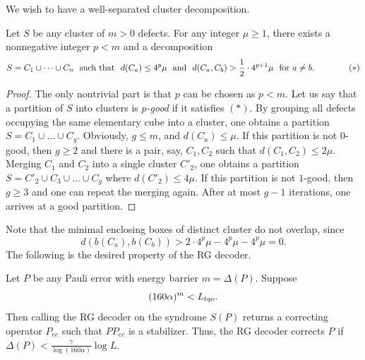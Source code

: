 We wish to have a well-separated cluster decomposition.
\begin{lem}
\label{lemma:wellseparated-decomposition}
Let $S$ be any cluster of $m>0$ defects.
For any integer $\mu \ge 1$, there exists a nonnegative integer $ p < m$ 
and a decomposition 
\[
S = C_1 \cup \cdots \cup C_n \ \text{ such that }\ 
d(C_a) \le 4^p \mu \ \text{ and }\  d(C_a,C_b) > \half \cdot 4^{p+1} \mu \ \text{ for } a \neq b.
\quad \quad \quad \quad \mathrm{(*)}
\]
\end{lem}
\begin{proof}
The only nontrivial part is that $p$ can be chosen as $p < m$.
Let us say that a partition of $S$ into clusters is \emph{$p$-good} if it satisfies $\mathrm{(*)}$.
By grouping all defects occupying the same elementary cube into a cluster,
one obtains a partition $S=C_1\cup \ldots \cup C_g$. Obviously, $g\le m$, and $d(C_a) \le \mu$.
If this partition is not $0$-good,
then $g\ge 2$ and there is a pair, say, $C_1,C_2$ such that $d(C_1, C_2) \le 2\mu$.
Merging $C_1$ and $C_2$ into a single cluster $C'_2$,
one obtains a partition $S=C'_2 \cup C_3 \cup \ldots \cup C_g$ where $d(C'_2) \le 4\mu$.
If this partition is not $1$-good, then $g\ge 3$ and one can repeat the merging again.
After at most $g-1$ iterations, one arrives at a good partition.
\end{proof}
Note that the minimal enclosing boxes of distinct cluster do not overlap, since
\[
 d(b(C_a),b(C_b)) > 2 \cdot 4^p \mu - 4^p \mu - 4^p \mu = 0 .
\]
The following is the desired property of the RG decoder.
\begin{lem}
\label{lemma:RGdecoder-capability}
Let $P$ be any Pauli error with energy barrier $m=\Delta(P)$. Suppose
\[
 (160\alpha)^m < {L_{tqo}} .
\]
Then calling the RG decoder on the syndrome $S(P)$ returns a correcting operator
$P_{ec}$ such that $P P_{ec}$ is a stabilizer.
Thus, the RG decoder corrects $P$ if $\Delta(P) < \frac{\gamma}{\log (160 \alpha)} \log L$.
\end{lem}
